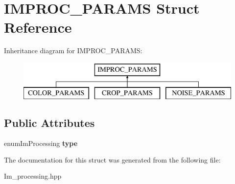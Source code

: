 \hypertarget{struct_i_m_p_r_o_c___p_a_r_a_m_s}{\section{I\+M\+P\+R\+O\+C\+\_\+\+P\+A\+R\+A\+M\+S Struct Reference}
\label{struct_i_m_p_r_o_c___p_a_r_a_m_s}
}
Inheritance diagram for I\+M\+P\+R\+O\+C\+\_\+\+P\+A\+R\+A\+M\+S\+:\begin{figure}[H]
\begin{center}
\leavevmode
\includegraphics[height=2.000000cm]{struct_i_m_p_r_o_c___p_a_r_a_m_s}
\end{center}
\end{figure}
\subsection*{Public Attributes}
\begin{DoxyCompactItemize}
\item 
\hypertarget{struct_i_m_p_r_o_c___p_a_r_a_m_s_a9c9573a9ddf01e2cb8dcee79d581cc7f}{enum\+Im\+Processing {\bfseries type}}\label{struct_i_m_p_r_o_c___p_a_r_a_m_s_a9c9573a9ddf01e2cb8dcee79d581cc7f}

\end{DoxyCompactItemize}


The documentation for this struct was generated from the following file\+:\begin{DoxyCompactItemize}
\item 
Im\+\_\+processing.\+hpp\end{DoxyCompactItemize}
